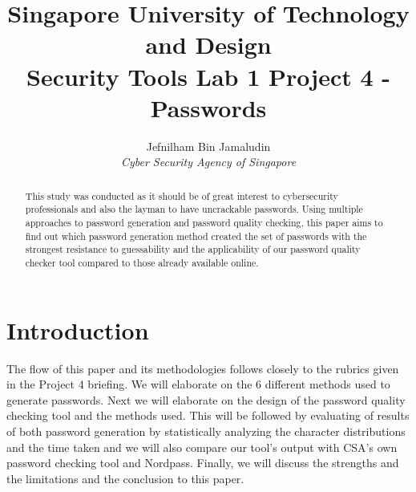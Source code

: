 \documentclass[letterpaper,twocolumn,10pt]{article}
\begin{document}

\date{}

\title{\Large \bf Singapore University of Technology and Design\\Security Tools Lab 1 Project 4 - Passwords}

\author{
{\rm Jefnilham Bin Jamaludin}\\
\emph{Cyber Security Agency of Singapore}

} %

\maketitle

\setcounter{page}{1}
\begin{abstract}
This study was conducted as it should be of great interest to cybersecurity professionals and also the layman to have uncrackable passwords. Using multiple approaches to password generation and password quality checking, this paper aims to find out which password generation method created the set of passwords with the strongest resistance to guessability and the applicability of our password quality checker tool compared to those already available online.

\end{abstract}

\section{Introduction}
The flow of this paper and its methodologies follows closely to the rubrics given in the Project 4 briefing. We will elaborate on the 6 different methods used to generate passwords. Next we will elaborate on the design of the password quality checking tool and the methods used. This will be followed by evaluating of results of both password generation by statistically analyzing the character distributions and the time taken and we will also compare our tool's output with CSA's own password checking tool and Nordpass. Finally, we will discuss the strengths and the limitations and the conclusion to this paper.
\end{document}
